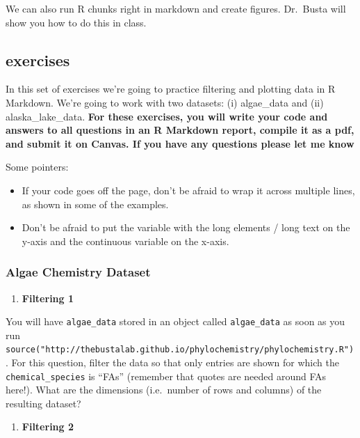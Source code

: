 \documentclass[
]{krantz}
\providecommand{\tightlist}{%
  \setlength{\itemsep}{0pt}\setlength{\parskip}{0pt}}
\begin{document}
We can also run R chunks right in markdown and create figures. Dr.~Busta will show you how to do this in class.

\hypertarget{exercises}{%
\subsection{exercises}\label{exercises}}

In this set of exercises we're going to practice filtering and plotting data in R Markdown. We're going to work with two datasets: (i) algae\_data and (ii) alaska\_lake\_data. \textbf{For these exercises, you will write your code and answers to all questions in an R Markdown report, compile it as a pdf, and submit it on Canvas. If you have any questions please let me know}

Some pointers:

\begin{itemize}
\item
  If your code goes off the page, don't be afraid to wrap it across multiple lines, as shown in some of the examples.
\item
  Don't be afraid to put the variable with the long elements / long text on the y-axis and the continuous variable on the x-axis.
\end{itemize}

\hypertarget{algae-chemistry-dataset}{%
\subsubsection{Algae Chemistry Dataset}\label{algae-chemistry-dataset}}

\begin{enumerate}
\def\labelenumi{\arabic{enumi}.}
\tightlist
\item
  \textbf{Filtering 1}
\end{enumerate}

You will have \texttt{algae\_data} stored in an object called \texttt{algae\_data} as soon as you run \texttt{source("http://thebustalab.github.io/phylochemistry/phylochemistry.R")}. For this question, filter the data so that only entries are shown for which the \texttt{chemical\_species} is ``FAs'' (remember that quotes are needed around FAs here!). What are the dimensions (i.e.~number of rows and columns) of the resulting dataset?

\begin{enumerate}
\def\labelenumi{\arabic{enumi}.}
\setcounter{enumi}{1}
\tightlist
\item
  \textbf{Filtering 2}
\end{enumerate}
\end{document}
